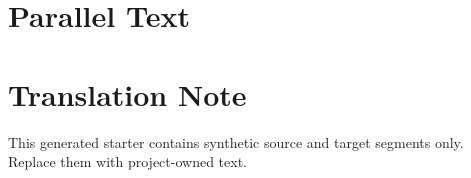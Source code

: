 \documentclass[10pt,twoside,openany]{book}
\begin{document}
\PSEBeginFrontMatter
\PSETitlePage
\PSEPublicationPage
\tableofcontents
\clearpage
\PSEBeginBody
\chapter{Parallel Text}

\PSEBeginBackMatter
\chapter*{Translation Note}
This generated starter contains synthetic source and target segments only. Replace them with project-owned text.
\PSEPrintIndex
\end{document}
